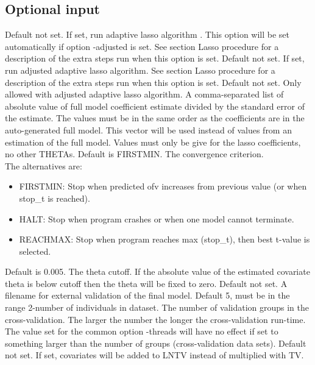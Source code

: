 \subsection{Optional input}
\begin{optionlist}
Default not set. If set, run adaptive lasso algorithm \cite{Haem}.  This option will be set automatically if option -adjusted is set. See section Lasso procedure for a description of the extra steps run when this option is set.
\nextopt
{}
Default not set. If set, run adjusted adaptive lasso algorithm. See section Lasso procedure for a description of the extra steps run when this option is set.
\nextopt
{}
Default not set. Only allowed with adjusted adaptive lasso algorithm. A comma-separated list of absolute value of full model coefficient estimate divided by the standard error of the estimate. The values must be in the same order as the coefficients are in the auto-generated
full model. This vector will be used instead of values from an estimation of the full model. Values must only be give for the lasso coefficients, no other THETAs.
\nextopt
{}
Default is FIRSTMIN. The convergence criterion.\\ 
The alternatives are:
\begin{itemize} 
	\item FIRSTMIN: Stop when predicted ofv increases from previous value (or when stop\_t is reached). 
	\item HALT: Stop when program crashes or when one model cannot terminate. 
	\item REACHMAX: Stop when program reaches max (stop\_t), then best t-value is selected. 
	\end{itemize}
\nextopt
{}
Default is 0.005. The theta cutoff. If the absolute value of the estimated covariate theta is below cutoff then the theta will be fixed to zero. 
\nextopt
{}
Default not set. A filename for external validation of the final model.
\nextopt
{}
Default 5, must be in the range 2-number of individuals in dataset. The number of validation groups in the cross-validation. The larger the number the longer the cross-validation run-time. The value set for the common option -threads will have no effect if set to something larger than the number of groups (cross-validation data sets).
\nextopt
{}
Default not set. If set, covariates will be added to LNTV instead of multiplied with TV. 

\end{optionlist}
